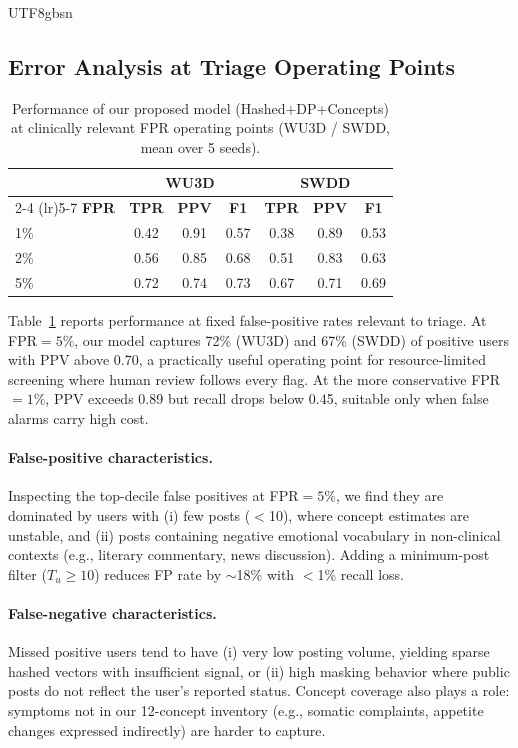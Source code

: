 \documentclass[lettersize,journal]{IEEEtran}
\renewcommand{\arraystretch}{0.99}
\begin{document}
\begin{CJK*}{UTF8}{gbsn}
\subsection{Error Analysis at Triage Operating Points}
\label{sec:results:error}


\begin{table}[t]
\centering
\caption{Performance of our proposed model (Hashed+DP+Concepts) at clinically relevant FPR operating points (WU3D / SWDD, mean over 5 seeds).}
\label{tab:triage}
\renewcommand{\arraystretch}{1.05}
\begin{tabular}{lcccccc}
\toprule
& \multicolumn{3}{c}{\textbf{WU3D}} & \multicolumn{3}{c}{\textbf{SWDD}} \\
\cmidrule(lr){2-4} \cmidrule(lr){5-7}
\textbf{FPR} & \textbf{TPR} & \textbf{PPV} & \textbf{F1} & \textbf{TPR} & \textbf{PPV} & \textbf{F1} \\
\midrule
1\% & 0.42 & 0.91 & 0.57 & 0.38 & 0.89 & 0.53 \\
2\% & 0.56 & 0.85 & 0.68 & 0.51 & 0.83 & 0.63 \\
5\% & 0.72 & 0.74 & 0.73 & 0.67 & 0.71 & 0.69 \\
\bottomrule
\end{tabular}
\end{table}

Table~\ref{tab:triage} reports performance at fixed false-positive rates relevant to triage. At FPR${=}5\%$, our model captures 72\% (WU3D) and 67\% (SWDD) of positive users with PPV above 0.70, a practically useful operating point for resource-limited screening where human review follows every flag. At the more conservative FPR${=}1\%$, PPV exceeds 0.89 but recall drops below 0.45, suitable only when false alarms carry high cost.

\paragraph{False-positive characteristics.}
Inspecting the top-decile false positives at FPR${=}5\%$, we find they are dominated by users with (i) few posts ($<$10), where concept estimates are unstable, and (ii) posts containing negative emotional vocabulary in non-clinical contexts (e.g., literary commentary, news discussion). Adding a minimum-post filter ($T_u \ge 10$) reduces FP rate by ${\sim}$18\% with $<$1\% recall loss.

\paragraph{False-negative characteristics.}
Missed positive users tend to have (i) very low posting volume, yielding sparse hashed vectors with insufficient signal, or (ii) high masking behavior where public posts do not reflect the user's reported status. Concept coverage also plays a role: symptoms not in our 12-concept inventory (e.g., somatic complaints, appetite changes expressed indirectly) are harder to capture.


\end{CJK*}
\end{document}
